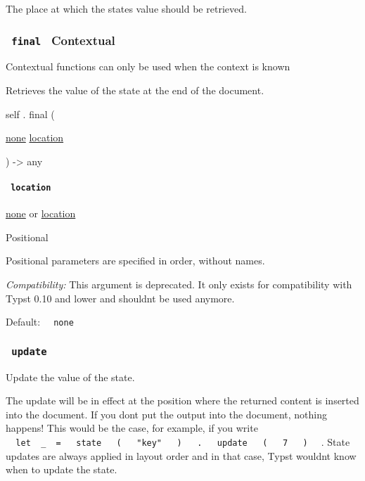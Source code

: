 The place at which the state\textquotesingle s value should be
retrieved.

\subsubsection{\texorpdfstring{\texttt{\ final\ } {{ Contextual
}}}{ final   Contextual }}\label{definitions-final}

\label{definitions-final-contextual-tooltip}
Contextual functions can only be used when the context is known

Retrieves the value of the state at the end of the document.

self { . } { final } (

{ \href{/docs/reference/foundations/none/}{none}
\href{/docs/reference/introspection/location/}{location} }

) -\textgreater{} { any }

\paragraph{\texorpdfstring{\texttt{\ location\ }}{ location }}\label{definitions-final-location}

\href{/docs/reference/foundations/none/}{none} {or}
\href{/docs/reference/introspection/location/}{location}

{{ Positional }}

\label{definitions-final-location-positional-tooltip}
Positional parameters are specified in order, without names.

\emph{Compatibility:} This argument is deprecated. It only exists for
compatibility with Typst 0.10 and lower and shouldn\textquotesingle t be
used anymore.

Default: \texttt{\ }{\texttt{\ none\ }}\texttt{\ }

\subsubsection{\texorpdfstring{\texttt{\ update\ }}{ update }}\label{definitions-update}

Update the value of the state.

The update will be in effect at the position where the returned content
is inserted into the document. If you don\textquotesingle t put the
output into the document, nothing happens! This would be the case, for
example, if you write
\texttt{\ }{\texttt{\ let\ }}\texttt{\ \_\ }{\texttt{\ =\ }}\texttt{\ }{\texttt{\ state\ }}\texttt{\ }{\texttt{\ (\ }}\texttt{\ }{\texttt{\ "key"\ }}\texttt{\ }{\texttt{\ )\ }}\texttt{\ }{\texttt{\ .\ }}\texttt{\ }{\texttt{\ update\ }}\texttt{\ }{\texttt{\ (\ }}\texttt{\ }{\texttt{\ 7\ }}\texttt{\ }{\texttt{\ )\ }}\texttt{\ }
. State updates are always applied in layout order and in that case,
Typst wouldn\textquotesingle t know when to update the state.

